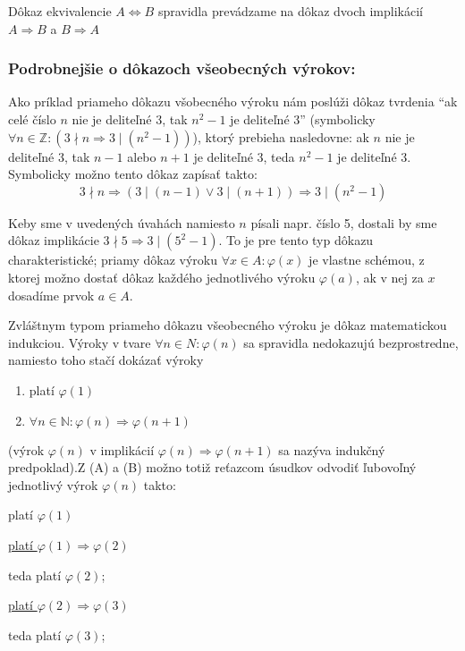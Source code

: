 Dôkaz ekvivalencie $A \iff B$ spravidla prevádzame na dôkaz dvoch implikácií
$A \Rightarrow B$ a $B \Rightarrow A$

\subsubsection*{Podrobnejšie o dôkazoch všeobecných výrokov:}
Ako príklad priameho dôkazu všobecného výroku nám poslúži dôkaz tvrdenia
\enquote{ak celé číslo $n$ nie je deliteľné 3, tak $n^2 - 1$ je deliteľné 3}
(symbolicky $\forall n \in \mathbb{Z}: (3 \nmid n \Rightarrow 3 \mid
(n^2 - 1))$), ktorý prebieha nasledovne: ak $n$ nie je deliteľné 3, tak
$n - 1$ alebo $n + 1$ je deliteľné 3, teda $n^2 - 1$ je deliteľné 3. Symbolicky
možno tento dôkaz zapísať takto:
\[
3 \nmid n
\Rightarrow (3 \mid (n - 1) \lor 3 \mid (n + 1))
\Rightarrow 3 \mid (n^2 - 1)
\]

Keby sme v uvedených úvahách namiesto $n$ písali napr. číslo 5, dostali by sme
dôkaz implikácie $3 \nmid 5 \Rightarrow 3 \mid (5^2 - 1)$. To je pre tento typ
dôkazu charakteristické; priamy dôkaz výroku $\forall x \in A: \varphi (x)$ je
vlastne schémou, z ktorej možno dostať dôkaz každého jednotlivého výroku
$\varphi (a)$, ak v nej za $x$ dosadíme prvok $a \in A$.

Zvláštnym typom priameho dôkazu všeobecného výroku je dôkaz matematickou
indukciou. Výroky v tvare $\forall n \in N: \varphi (n)$ sa spravidla nedokazujú
bezprostredne, namiesto toho stačí dokázať výroky
\begin{enumerate}[label=(\Alph*)]
  \item platí $\varphi (1)$
  \item $\forall n \in \mathbb{N}: \varphi (n) \Rightarrow \varphi (n + 1)$
\end{enumerate}
(výrok $\varphi (n)$ v implikácií $\varphi (n) \Rightarrow \varphi (n + 1)$ sa
nazýva indukčný predpoklad).Z (A) a (B) možno totiž reťazcom úsudkov odvodiť
ľubovoľný jednotlivý výrok $\varphi (n)$ takto:

platí $\varphi (1)$

\underline{platí $\varphi (1) \Rightarrow \varphi (2)$}

\hspace{1em} teda platí $\varphi (2)$;

\hspace{3.2em} \underline{platí $\varphi(2) \Rightarrow \varphi(3)$}

\hspace{4.4em} teda platí $\varphi(3)$;

